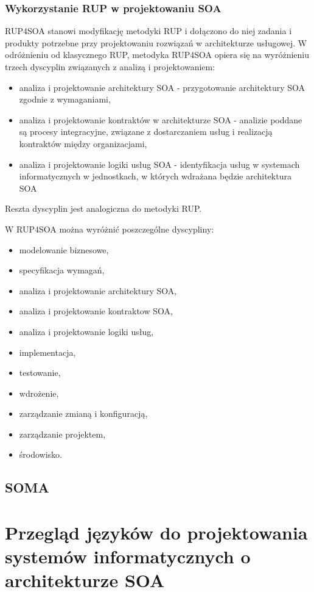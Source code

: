 \subsection{Wykorzystanie RUP w projektowaniu SOA}
RUP4SOA stanowi modyfikację metodyki RUP i dołączono do niej zadania i produkty potrzebne przy projektowaniu rozwiązań w architekturze usługowej. W odróżnieniu od klasycznego RUP, metodyka RUP4SOA opiera się na wyróżnieniu trzech dyscyplin związanych z analizą i projektowaniem:
\begin{itemize}
\item{analiza i projektowanie architektury SOA - przygotowanie architektury SOA zgodnie z wymaganiami,}
\item{analiza i projektowanie kontraktów w architekturze SOA - analizie poddane są procesy integracyjne, związane z dostarczaniem usług i realizacją kontraktów między organizacjami,}
\item{analiza i projektowanie logiki usług SOA - identyfikacja usług w systemach informatycznych w jednostkach, w których wdrażana będzie architektura SOA}
\end{itemize}
Reszta dyscyplin jest analogiczna do metodyki RUP. \cite{PlatIntGor}

W RUP4SOA można wyróżnić poszczególne dyscypliny:
\begin{itemize}
\item {modelowanie biznesowe,}
\item {specyfikacja wymagań,}
\item {analiza i projektowanie architektury SOA,}
\item {analiza i projektowanie kontraktow SOA,}
\item {analiza i projektowanie logiki usług,}
\item {implementacja,}
\item {testowanie,}
\item {wdrożenie,}
\item {zarządzanie zmianą i konfiguracją,}
\item {zarządzanie projektem,}
\item {środowisko.}
\end{itemize}

\section{SOMA}

\chapter{Przegląd języków do projektowania systemów informatycznych o architekturze SOA}
